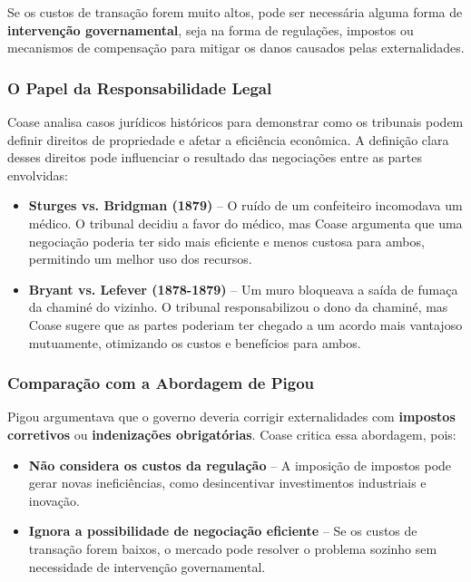 \documentclass[a4paper,12pt]{article}[abntex2]
\begin{document}
Se os custos de transação forem muito altos, pode ser necessária alguma forma de \textbf{intervenção governamental}, seja na forma de regulações, impostos ou mecanismos de compensação para mitigar os danos causados pelas externalidades.

\subsubsection{O Papel da Responsabilidade Legal}

Coase analisa casos jurídicos históricos para demonstrar como os tribunais podem definir direitos de propriedade e afetar a eficiência econômica. A definição clara desses direitos pode influenciar o resultado das negociações entre as partes envolvidas:

\begin{itemize}
    \item \textbf{Sturges vs. Bridgman (1879)} – O ruído de um confeiteiro incomodava um médico. O tribunal decidiu a favor do médico, mas Coase argumenta que uma negociação poderia ter sido mais eficiente e menos custosa para ambos, permitindo um melhor uso dos recursos.
    \item \textbf{Bryant vs. Lefever (1878-1879)} – Um muro bloqueava a saída de fumaça da chaminé do vizinho. O tribunal responsabilizou o dono da chaminé, mas Coase sugere que as partes poderiam ter chegado a um acordo mais vantajoso mutuamente, otimizando os custos e benefícios para ambos.
\end{itemize}

\subsubsection{Comparação com a Abordagem de Pigou}

Pigou argumentava que o governo deveria corrigir externalidades com \textbf{impostos corretivos} ou \textbf{indenizações obrigatórias}. Coase critica essa abordagem, pois:

\begin{itemize}
    \item \textbf{Não considera os custos da regulação} – A imposição de impostos pode gerar novas ineficiências, como desincentivar investimentos industriais e inovação.
    \item \textbf{Ignora a possibilidade de negociação eficiente} – Se os custos de transação forem baixos, o mercado pode resolver o problema sozinho sem necessidade de intervenção governamental.
\end{itemize}
\end{document}

